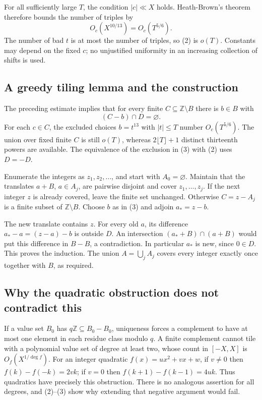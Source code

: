 For all sufficiently large $T$, the condition $|c|\ll X$ holds. Heath-Brown's theorem therefore bounds the number of triples by
\[O_c(X^{10/13})=O_c(T^{5/6}).\tag{2}\]
The number of bad $t$ is at most the number of triples, so (2) is $o(T)$. Constants may depend on the fixed $c$; no unjustified uniformity in an increasing collection of shifts is used.

\subsection*{A greedy tiling lemma and the construction}
The preceding estimate implies that for every finite $C\subseteq\mathbb Z\setminus B$ there is $b\in B$ with
\[(C-b)\cap D=\varnothing.\tag{3}\]
For each $c\in C$, the excluded choices $b=t^{13}$ with $|t|\le T$ number $O_c(T^{5/6})$. The union over fixed finite $C$ is still $o(T)$, whereas $2\lfloor T\rfloor+1$ distinct thirteenth powers are available. The equivalence of the exclusion in (3) with (2) uses $D=-D$.

Enumerate the integers as $z_1,z_2,\ldots$, and start with $A_0=\varnothing$. Maintain that the translates $a+B$, $a\in A_j$, are pairwise disjoint and cover $z_1,\ldots,z_j$. If the next integer $z$ is already covered, leave the finite set unchanged. Otherwise $C=z-A_j$ is a finite subset of $\mathbb Z\setminus B$. Choose $b$ as in (3) and adjoin $a_*=z-b$.

The new translate contains $z$. For every old $a$, its difference $a_*-a=(z-a)-b$ is outside $D$. An intersection $(a_*+B)\cap(a+B)$ would put this difference in $B-B$, a contradiction. In particular $a_*$ is new, since $0\in D$. This proves the induction. The union $A=\bigcup_j A_j$ covers every integer exactly once together with $B$, as required.

\subsection*{Why the quadratic obstruction does not contradict this}
If a value set $B_0$ has $q\mathbb Z\subseteq B_0-B_0$, uniqueness forces a complement to have at most one element in each residue class modulo $q$. A finite complement cannot tile with a polynomial value set of degree at least two, whose count in $[-X,X]$ is $O_f(X^{1/\deg f})$.
For an integer quadratic $f(x)=ux^2+vx+w$, if $v\ne0$ then $f(k)-f(-k)=2vk$; if $v=0$ then $f(k+1)-f(k-1)=4uk$. Thus quadratics have precisely this obstruction. There is no analogous assertion for all degrees, and (2)--(3) show why extending that negative argument would fail.

